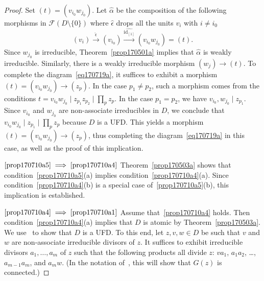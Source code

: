 \documentclass[reqno]{amsart}
\theoremstyle{plain}
\theoremstyle{definition}
\newcommand{\cat}[1]{\mathcal{#1}}
\newcommand{\catf}{\cat{F}}
\newcommand{\id}{\operatorname{id}}
\newcommand{\xra}{\xrightarrow}
\numberwithin{equation}{lem}
\begin{document}
\begin{proof}
Set $(t)=(v_{i_0}w_{j_0})$.
Let $\hat\alpha$ be the composition of the following morphisms in $\catf(D\setminus\{0\})$
where $\hat\epsilon$ drops all the units $v_i$ with $i\neq i_0$ 
$$
(v_i)\xra{\hat\epsilon}(v_{i_0})\xra{\widehat{\id_{[1]}}}(v_{i_0}w_{j_0})=(t).
$$
Since $w_{j_0}$ is irreducible, Theorem~\ref{prop170501a} implies that $\hat\alpha$ is 
weakly irreducible. 
Similarly, there is a weakly irreducible morphism 
$(w_j)\to(t)$.
To complete the diagram~\eqref{eq170719a}, it suffices to exhibit a morphism $(t)=(v_{i_0}w_{j_0})\to(z_p)$.
In the case $p_1\neq p_2$, such a morphism comes from the  conditions $t=v_{i_0}w_{j_0}\mid z_{p_1}z_{p_2}\mid\prod_pz_p$.
In the case $p_1= p_2$, we have $v_{i_0},w_{j_0}\mid z_{p_1}$.
Since
$v_{i_0}$ and $w_{j_0}$ are non-associate irreducibles in $D$,
we conclude that $v_{i_0}w_{j_0}\mid z_{p_1}\mid\prod_pz_p$ because $D$ is a UFD.
This yields a morphism $(t)=(v_{i_0}w_{j_0})\to(z_p)$, thus
completing the diagram~\eqref{eq170719a} in this case, as well as the proof of this implication.


$\eqref{prop170710a5}\implies\eqref{prop170710a4}$
Theorem~\ref{prop170503a} shows that condition~\eqref{prop170710a5}(a) implies condition~\eqref{prop170710a4}(a).
Since condition~\eqref{prop170710a4}(b) is a special case of~\eqref{prop170710a5}(b),
this implication is established.


$\eqref{prop170710a4}\implies\eqref{prop170710a1}$
Assume that~\eqref{prop170710a4} holds.
Then condition~\eqref{prop170710a4}(a) implies that $D$ is atomic by Theorem~\ref{prop170503a}.
We use~\cite[Theorem~5.1]{coykendall:idg}
to show that $D$ is a UFD.
To this end, let $z,v,w\in D$ be such that $v$ and $w$ are non-associate irreducible divisors of $z$. 
It
suffices to exhibit irreducible divisors $a_1,\ldots,a_m$ of $z$
such that the following products all divide $z$: $va_1$, $a_1a_2$, \ldots, $a_{m-1}a_m$, and $a_mw$.
(In the notation of~\cite[Theorem~5.1]{coykendall:idg},
this will show that $G(z)$ is connected.)


\end{proof}
\end{document}
